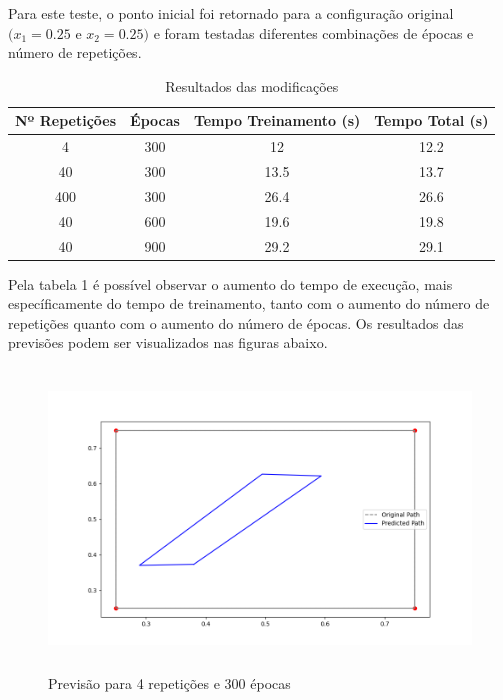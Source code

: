 \documentclass[12 pt]{article}
\begin{document}
\begin{enumerate}
    Para este teste, o ponto inicial foi retornado para a configuração original $(x_1=0.25$ e $x_2=0.25)$ e foram testadas diferentes combinações de épocas e número de repetições.

    \begin{table}[H]
        \centering
        \caption{Resultados das modificações}
        \begin{tabular}{|c|c|c|c|}
            \hline
            Nº Repetições & Épocas & Tempo Treinamento (s) & Tempo Total (s) \\
            \hline
            4 & 300 & 12 & 12.2 \\
            \hline
            40 & 300 & 13.5 & 13.7 \\
            \hline
            400 & 300 & 26.4 & 26.6 \\
            \hline
            40 & 600 & 19.6 & 19.8 \\
            \hline
            40 & 900 & 29.2 & 29.1 \\
            \hline
        \end{tabular}
    \end{table}

    Pela tabela 1 é possível observar o aumento do tempo de execução, mais específicamente do tempo de treinamento, tanto com o aumento do número de repetições quanto com o aumento do número de épocas. Os resultados das previsões podem ser visualizados nas figuras abaixo.
    

    \begin{figure}[H]
        \caption{Previsão para 4 repetições e 300 épocas}
           \centering
           \includegraphics[height=8cm]{Item_4_4_300.png}
    \end{figure}


\end{enumerate}
\end{document}
